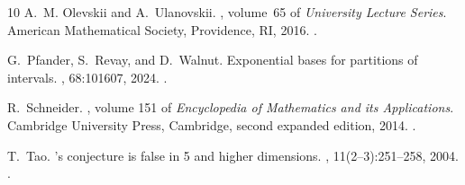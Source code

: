 \documentclass[12pt,reqno,tbtags]{amsart}
\newcommand\1{\mathbbm{1}}
\begin{document}
\begin{thebibliography}{10}
A.~M. Olevskii and A.~Ulanovskii.
, volume~65 of {\em University Lecture Series}.
\newblock American Mathematical Society, Providence, RI, 2016.
\newblock \href {https://doi.org/10.1090/ulect/065}
  {}.

G.~Pfander, S.~Revay, and D.~Walnut.
\newblock Exponential bases for partitions of intervals.
, 68:101607, 2024.
\newblock \href {https://doi.org/10.1016/j.acha.2023.101607}
  {}.

R.~Schneider.
, volume 151 of
  {\em Encyclopedia of Mathematics and its Applications}.
\newblock Cambridge University Press, Cambridge, second expanded edition, 2014.
\newblock \href {https://doi.org/10.1017/CBO9781139003858}
  {}.

T.~Tao.
's conjecture is false in 5 and higher dimensions.
, 11(2--3):251--258, 2004.
\newblock \href {https://doi.org/10.4310/MRL.2004.v11.n2.a8}
  {}.

\end{thebibliography}
\endgroup
\end{document}
